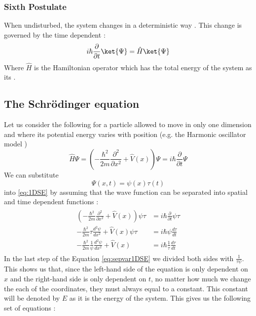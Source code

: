 \documentclass[../master_thesis.tex]{subfiles}
\begin{document}
\subsubsection{Sixth Postulate}
When undisturbed, the system changes in a deterministic way \cite{Cohen:1973}.
This change is governed by the time dependent \SE \cite{Cohen:1973, Atkins:2011}:
\begin{equation}\label{eq:tdepSE}
  i\hbar\frac{\partial}{\partial t} \ket{\Psi} = \hat{H}\ket{\Psi}
\end{equation}
Where $\hat{H}$ is the Hamiltonian operator which has the total energy of the
system as its \eivals.

\subsection{The Schr\"{o}dinger equation}
Let us consider the following \SE for a particle allowed to move in only one dimension
and where its potential energy varies with position (e.g. the Harmonic oscillator
model \cite{Cohen:1973, Atkins:2014})
\begin{equation}
  \hat{H}\Psi = \left(-\frac{\hbar^2}{2m}\frac{\partial^2 }{\partial x^2} + \hat{V}(x)\right)\Psi = i\hbar\frac{\partial}{\partial t} \Psi\label{eq:1DSE}
\end{equation}
We can substitute $$\Psi(x, t)=\psi(x)\tau(t)$$ into \ref{eq:1DSE}
by assuming that the wave function can be separated into spatial and time dependent
functions \cite{Atkins:2011}:
\begin{align}
  \begin{split}\label{eq:sepvar1DSE}
    \left(-\frac{\hbar^2}{2m}\frac{\partial^2 }{\partial x^2} + \hat{V}(x)\right)\psi\tau &= i\hbar\frac{\partial}{\partial t} \psi\tau \\
    -\frac{\hbar^2}{2m}\tau\frac{d^2 \psi}{d x^2} + \hat{V}(x)\psi\tau &= i\hbar\psi\frac{d\tau}{d t}\\
    -\frac{\hbar^2}{2m}\frac{1}{\psi}\frac{d^2\psi }{d x^2} + \hat{V}(x) &= i\hbar\frac{1}{\tau}\frac{d\tau}{d t}
  \end{split}
\end{align}
In the last step of the Equation \ref{eq:sepvar1DSE} we divided both sides with $\frac{1}{\tau\psi}$.
This shows us that, since the left-hand side of the equation is only dependent on $x$ and the right-hand
side is only dependent on $t$, no matter how much we change the each of the coordinates, they must always equal to
a constant. This constant will be denoted by $E$ as it is the energy of the system. This gives us the following set of equations \cite{Atkins:2011}:
\end{document}
